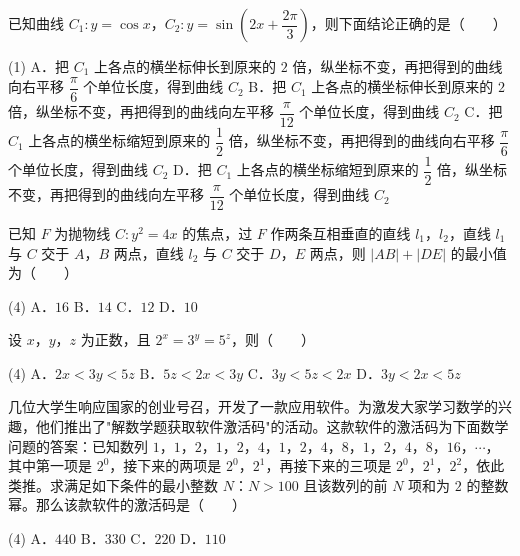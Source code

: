 \begin{question}
已知曲线 $C_1:y=\cos x$，$C_2:y=\sin\left(2x+\dfrac{2\pi}3\right)$，则下面结论正确的是\mbox{（　　）}

\begin{gkopts}(1)
\task A．把 $C_1$ 上各点的横坐标伸长到原来的 $2$ 倍，纵坐标不变，再把得到的曲线向右平移 $\dfrac\pi6$ 个单位长度，得到曲线 $C_2$
\task B．把 $C_1$ 上各点的横坐标伸长到原来的 $2$ 倍，纵坐标不变，再把得到的曲线向左平移 $\dfrac\pi{12}$ 个单位长度，得到曲线 $C_2$
\task C．把 $C_1$ 上各点的横坐标缩短到原来的 $\dfrac12$ 倍，纵坐标不变，再把得到的曲线向右平移 $\dfrac\pi6$ 个单位长度，得到曲线 $C_2$
\task D．把 $C_1$ 上各点的横坐标缩短到原来的 $\dfrac12$ 倍，纵坐标不变，再把得到的曲线向左平移 $\dfrac\pi{12}$ 个单位长度，得到曲线 $C_2$
\end{gkopts}

\end{question}
\begin{question}
已知 $F$ 为抛物线 $C:y^{2}=4x$ 的焦点，过 $F$ 作两条互相垂直的直线 $l_1$，$l_2$，直线 $l_1$ 与 $C$ 交于 $A$，$B$ 两点，直线 $l_2$ 与 $C$ 交于 $D$，$E$ 两点，则 $|AB|+|DE|$ 的最小值为\mbox{（　　）}

\begin{gkopts}(4)
\task A．$16$
\task B．$14$
\task C．$12$
\task D．$10$
\end{gkopts}

\end{question}
\begin{question}
设 $x$，$y$，$z$ 为正数，且 $2^{x}=3^{y}=5^{z}$，则\mbox{（　　）}

\begin{gkopts}(4)
\task A．$2x<3y<5z$
\task B．$5z<2x<3y$
\task C．$3y<5z<2x$
\task D．$3y<2x<5z$
\end{gkopts}

\end{question}
\begin{question}
几位大学生响应国家的创业号召，开发了一款应用软件。为激发大家学习数学的兴趣，他们推出了"解数学题获取软件激活码"的活动。这款软件的激活码为下面数学问题的答案：已知数列 $1$，$1$，$2$，$1$，$2$，$4$，$1$，$2$，$4$，$8$，$1$，$2$，$4$，$8$，$16$，$\cdots$，其中第一项是 $2^{0}$，接下来的两项是 $2^{0}$，$2^{1}$，再接下来的三项是 $2^{0}$，$2^{1}$，$2^{2}$，依此类推。求满足如下条件的最小整数 $N$：$N>100$ 且该数列的前 $N$ 项和为 $2$ 的整数幂。那么该款软件的激活码是\mbox{（　　）}

\begin{gkopts}(4)
\task A．$440$
\task B．$330$
\task C．$220$
\task D．$110$
\end{gkopts}

\par\medskip

\end{question}

